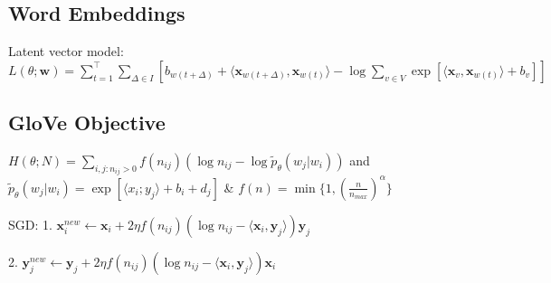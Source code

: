 \documentclass[a4paper, 11pt, landscape]{article}
\DeclareMathOperator*{\argmin}{arg\,min}
\begin{document}
\begin{multicols*}{3}
\section{Word Embeddings}
\begin{compactdesc}
  \item[Latent vector model:] $L(\theta; \mathbf{w}) = \sum_{t=1}^\top\sum_{\Delta \in I}[b_{w(t+\Delta)} + \langle \mathbf{x}_{w(t+\Delta)}, \mathbf{x}_{w(t)} \rangle - \log\sum_{v \in V}\exp[\langle \mathbf{x}_v, \mathbf{x}_{w(t)} \rangle + b_v]]$ 
\end{compactdesc}

\subsection{GloVe Objective}
\begin{compactitem}
  \item $H(\theta;N) = \sum_{i,j:n_{ij}>0} f(n_{ij})(\log n_{ij} - \log \tilde{p}_\theta(w_j|w_i))$ and
  $\tilde{p}_\theta(w_j|w_i) = \exp[\langle x_i; y_j \rangle + b_i + d_j]$ \& $f(n) = \min\{1, (\frac{n}{n_{max}})^\alpha\}$
  \item SGD: 1. $\mathbf{x}_i^{new} \leftarrow \mathbf{x}_i + 2\eta f(n_{ij})(\log n_{ij} - \langle \mathbf{x}_i, \mathbf{y}_j \rangle)\mathbf{y}_j$ 
  \item \hspace{28pt}2. $\mathbf{y}_j^{new} \leftarrow \mathbf{y}_j + 2\eta f(n_{ij})(\log n_{ij} - \langle \mathbf{x}_i, \mathbf{y}_j \rangle)\mathbf{x}_i$
\end{compactitem}



\end{multicols*}
\end{document}
